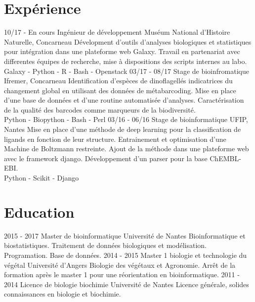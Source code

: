 \documentclass[]{friggeri-cv}
\begin{document}
\section{Expérience}
\begin{entrylist}
  \entry
    {10/17 - En cours}
    {Ingénieur de développement}
    {Muséum National d'Histoire Naturelle, Concarneau}
    {Dévelopment d'outils d'analyses biologiques et statistiques pour intégration dans une plateforme web Galaxy. Travail en partenariat avec differentes équipes de recherche, mise à dispositions des scripts internes au labo.\\
    Galaxy - Python - R - Bash - Openstack}
  \entry
    {03/17 - 08/17}
    {Stage de bioinfromatique}
    {Ifremer, Concarneau}
    {Identification d'espèces de dinoflagellés indicatrices du changement global en utilisant des données de métabarcoding. Mise en place d'une base de données et d'une routine automatisée d'analyses. Caractérisation de la qualité des barcodes comme marqueurs de la biodiversité.\\
    Python - Biopython - Bash - Perl}
    \entry
    {03/16 - 06/16}
    {Stage de bioinformatique}
    {UFIP, Nantes}
    {Mise en place d'une méthode de deep learning pour la classification de ligands en fonction de leur structure. Entrainement et optimisation d'une Machine de Boltzmann restreinte. Ajout de la méthode dans une plateforme web avec le framework django. Développement d'un parser pour la base ChEMBL-EBI.\\
    Python - Scikit - Django}
\end{entrylist}
\section{Education}
\begin{entrylist}
  \entry
    {2015 - 2017}
    {Master de bioinformatique}
    {Université de Nantes}
    {Bioinformatique et biostatistiques. Traitement de données biologiques et modélisation.\\
    Programation. Base de données.}
  \entry
    {2014 - 2015}
    {Master 1 biologie et technologie du végétal}
    {Université d'Angers}
    {Biologie des végétaux et Agronomie. Arrêt de la formation après le master 1 pour une réorientation en bioinformatique.}
  \entry
    {2011 - 2014}
    {Licence de biologie biochimie}
    {Université de Nantes}
    {Licence générale, solides connaissances en biologie et biochimie.\\}
\end{entrylist}
\end{document}
